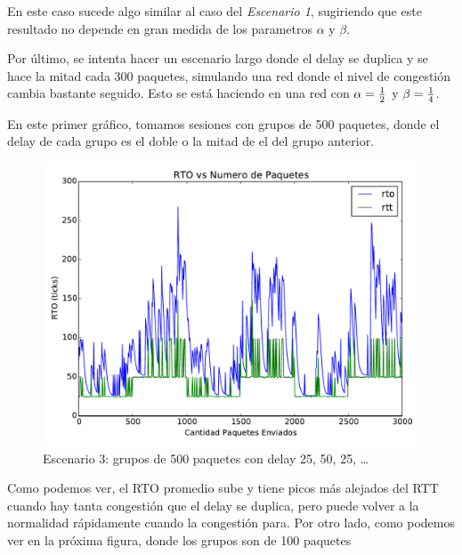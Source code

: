 		En este caso sucede algo similar al caso del \emph{Escenario 1},
		sugiriendo que este resultado no depende en gran medida de los
		parametros $\alpha$ y $\beta$.

		\hspace{1em}

		Por \'ultimo, se intenta hacer un escenario largo donde el delay se
		duplica y se hace la mitad cada 300 paquetes, simulando una red donde
		el nivel de congesti\'on cambia bastante seguido. Esto se est\'a
		haciendo en una red con $\alpha = {{1}\over{2}}$ y $\beta =
		{{1}\over{4}}$.

		En este primer gr\'afico, tomamos sesiones con grupos de 500 paquetes,
		donde el delay de cada grupo es el doble o la mitad de el del grupo
		anterior.

		\begin{figure}[H]
			\includegraphics[width=\textwidth]{imagenes/congestion_long.pdf}
            \caption*{Escenario 3: grupos de 500 paquetes con delay 25, 50, 25, \ldots}
		\end{figure}


		Como podemos ver, el RTO promedio sube y tiene picos m\'as alejados del
		RTT cuando hay tanta congesti\'on que el delay se duplica, pero puede
		volver a la normalidad r\'apidamente cuando la congesti\'on para. Por
		otro lado, como podemos ver en la pr\'oxima figura, donde los grupos son
		de 100 paquetes

